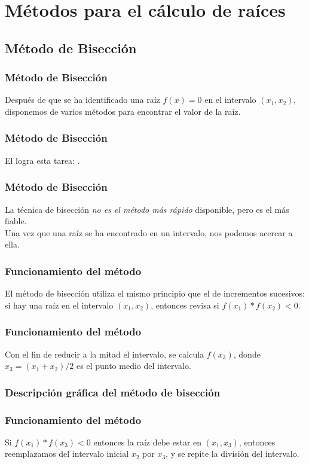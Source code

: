 \documentclass[12pt]{beamer}
\begin{document}
\section{Métodos para el cálculo de raíces}
\subsection{Método de Bisección}

\begin{frame}
\frametitle{Método de Bisección}
Después de que se ha identificado una raíz $ f(x) = 0$ en el intervalo $(x_{1}, x_{2})$, disponemos de varios métodos para encontrar el valor de la raíz.
\end{frame}
\begin{frame}
\frametitle{Método de Bisección}
El  logra esta tarea: \pause {}. 
\end{frame}
\begin{frame}
\frametitle{Método de Bisección}
La técnica de bisección \textit{no es el método más rápido} disponible, pero es el más fiable.
\\
\bigskip
\pause
Una vez que una raíz se ha encontrado en un intervalo, nos podemos acercar a ella.
\end{frame}
\begin{frame}
\frametitle{Funcionamiento del método}
El método de bisección utiliza el mismo principio que el de incrementos sucesivos: \pause si hay una raíz en el intervalo $(x_{1}, x_{2})$, entonces revisa si $f(x_{1}) * f(x_{2}) < 0$.
\end{frame}
\begin{frame}
\frametitle{Funcionamiento del método}
Con el fin de reducir a la mitad el intervalo, se calcula $f (x_{3})$, donde $x_{3} = (x_{1} + x_{2})/2$ es el punto medio del intervalo.
\end{frame}
\begin{frame}
\frametitle{Descripción gráfica del método de bisección}
\begin{figure}
	\centering
	
\end{figure}
\end{frame}
\begin{frame}
\frametitle{Funcionamiento del método}
Si $f (x_{1}) * f (x_{3}) < 0$ entonces la raíz debe estar en $(x_{1}, x_{3})$, \pause entonces reemplazamos del intervalo inicial $x_{2}$ por $x_{3}$, y se repite la división del intervalo.
\pause
\begin{figure}
	\centering
	
\end{figure}
\end{frame}
\end{document}

